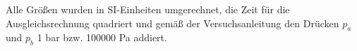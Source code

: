 

Alle Größen wurden in SI-Einheiten umgerechnet, die Zeit für die Ausgleichsrechnung quadriert und gemäß
der Versuchsanleitung \cite{v206} den Drücken $\textit{p}_\textit{a}$ und $\textit{p}_\textit{b}$ 1 bar bzw. 100000 Pa addiert. 
\\

